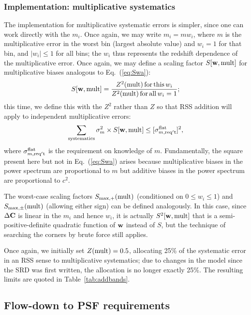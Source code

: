 \documentclass[usenatbib]{mnras}
\begin{document}
\subsubsection{Implementation: multiplicative systematics}
\label{ss:implement-mult}

The implementation for multiplicative systematic errors is simpler, since one can work directly with the $m_i$. Once again, we may write $m_i=mw_i$, where $m$ is the multiplicative error in the worst bin (largest absolute value) and $w_i=1$ for that bin, and $|w_i|\le 1$ for all bins; the $w_i$ thus represents the redshift dependence of the multiplicative error. Once again, we may define a scaling factor $S[{\bf w},{\rm mult}]$ for multiplicative biases analogous to Eq.~(\ref{eq:Swa}):
\begin{equation}
S[{\bf w},{\rm mult}] = \frac{Z^2({\rm mult}) \,{\rm for\,this\,}w_i}{Z^2({\rm mult})\,{\rm for\,all\,}w_i=1};
\end{equation}
this time, we define this with the $Z^2$ rather than $Z$ so that RSS addition will apply to independent multiplicative errors:
\begin{equation}
\sum_{\rm systematics} \sigma_m^2 \times S[{\bf w},{\rm mult}] \le [\sigma_{m,\rm req't}^{\rm flat}]^2,
\end{equation}
where $\sigma_{m,\rm req't}^{\rm flat}$ is the requirement on knowledge of $m$. Fundamentally, the square present here but not in Eq.~(\ref{eq:Swa}) arises because multiplicative biases in the power spectrum are proportional to $m$ but additive biases in the power spectrum are proportional to $c^2$.

The worst-case scaling factors $S_{\rm max,+}({\rm mult})$ (conditioned on $0\le w_i\le 1$) and $S_{\rm max,\pm}({\rm mult})$ (allowing either sign) can be defined analogously. In this case, since $\Delta{\bf C}$ is linear in the $m_i$ and hence $w_i$, it is actually $S^2[{\bf w},{\rm mult}]$ that is a semi-positive-definite quadratic function of ${\bf w}$ instead of $S$, but the technique of searching the corners by brute force still applies.

Once again, we initially set $Z({\rm mult})=0.5$, allocating 25\% of the systematic error in an RSS sense to multiplicative systematics; due to changes in the model since the SRD was first written, the allocation is no longer exactly 25\%. The resulting limits are quoted in Table~\ref{tab:addbands}.

\subsection{Flow-down to PSF requirements}
\end{document}
